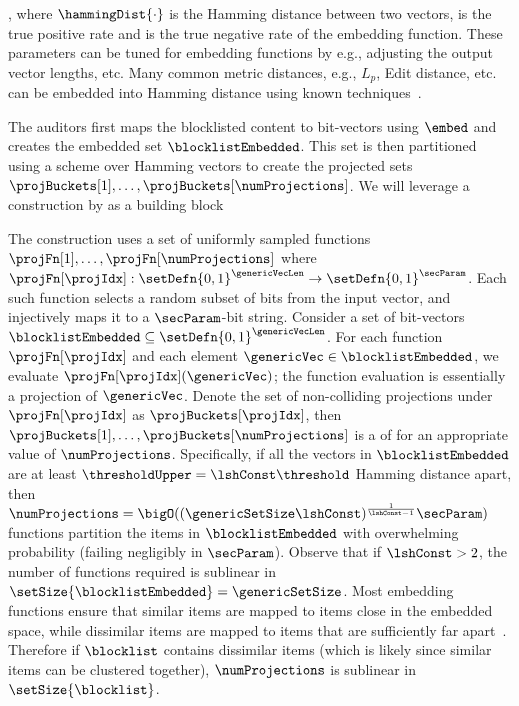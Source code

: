 , where $\hammingDist{\cdot}$ is the Hamming distance between two vectors, \tpr is the true 
positive rate and \tnr is the true negative rate of the embedding function. These parameters can be 
tuned for embedding functions by e.g., adjusting the output vector lengths, etc. Many common 
metric distances, e.g., $L_p$, Edit distance, etc. can be embedded into Hamming 
distance using known techniques~\cite{}. 

The auditors first maps the blocklisted content to bit-vectors using $\embed$ and creates the 
embedded set $\blocklistEmbedded$. This set is then partitioned using a 
\projectionPrimitive scheme over Hamming vectors to create the projected sets $\projBuckets[1], 
\dots, \projBuckets[\numProjections]$. We will leverage a construction by 
\citet{chongchitmate2024approximate} as a building block 

%
The construction uses a set of uniformly sampled functions $\projFn[1], \dots, 
\projFn[\numProjections]$ where $\projFn[\projIdx]: \setDefn{0,1}^{\genericVecLen} \rightarrow 
\setDefn{0,1}^{\secParam}$. Each such function selects a random subset of bits from the input 
vector, and injectively maps it to a $\secParam$-bit string. Consider a set of bit-vectors 
$\blocklistEmbedded \subseteq \setDefn{0,1}^{\genericVecLen}$. For each function 
$\projFn[\projIdx]$ and each element $\genericVec \in \blocklistEmbedded$, we evaluate 
$\projFn[\projIdx](\genericVec)$; the function evaluation is essentially a projection 
of $\genericVec$. Denote the set of non-colliding projections under $\projFn[\projIdx]$ as
$\projBuckets[\projIdx]$, then $\projBuckets[1], \dots, \projBuckets[\numProjections]$ is a 
\projectionPrimitive of \blocklistEmbedded for an appropriate value of $\numProjections$. 
Specifically, if all the vectors in $\blocklistEmbedded$ are at least $\thresholdUpper = \lshConst 
\threshold$ Hamming distance apart, then $\numProjections = \bigO((\genericSetSize 
\lshConst)^{\frac{1}{\lshConst - 1}} \secParam)$ functions partition the items in 
$\blocklistEmbedded$ with overwhelming probability (failing negligibly in 
$\secParam$). Observe that if $\lshConst > 2$, the number of functions required is sublinear in 
$\setSize{\blocklistEmbedded} = \genericSetSize$. Most embedding functions ensure that similar 
items are mapped to items close in the embedded space, while dissimilar items are mapped to items 
that are sufficiently far apart~\cite{}. Therefore if $\blocklist$ contains dissimilar items (which is 
likely since similar items can be clustered together), $\numProjections$ is sublinear in 
$\setSize{\blocklist}$. 




